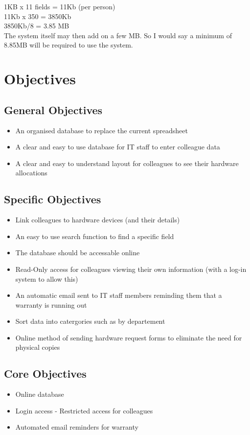 1KB x 11 fields = 11Kb (per person)\\
11Kb x 350 = 3850Kb\\
3850Kb/8 = 3.85 MB\\

The system itself may then add on a few MB. So I would say a minimum of 8.85MB will be required to use the system.


\section{Objectives}

\subsection{General Objectives}

\begin{itemize}
\item An organised database to replace the current spreadsheet
\item A clear and easy to use database for IT staff to enter colleague data
\item  A clear and easy to understand layout for colleagues to see their hardware allocations
\end{itemize}

\subsection{Specific Objectives}

\begin{itemize}
\item Link colleagues to hardware devices (and their details)
\item An easy to use search function to find a specific field
\item The database should be accessable online
\item Read-Only access for colleagues viewing their own information (with a log-in system to allow this)
\item  An automatic email sent to IT staff members reminding them that a warranty is running out
\item Sort data into catergories such as by departement
\item Online method of sending hardware request forms to eliminate the need for physical copies
\end{itemize}

\subsection{Core Objectives}
\begin{itemize}
\item Online database
\item Login access - Restricted access for colleagues
\item Automated email reminders for warranty
\end{itemize}

